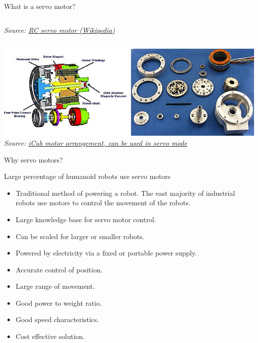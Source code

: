 \documentclass[compress]{beamer}
\newcommand{\source}[2]{{\tiny\it Source: \href{#1}{#2}}}
\begin{document}
\begin{frame}{What is a servo motor?}
\begin{columns}
\begin{column}{0.5\linewidth}
\begin{center}
    \source{http://en.wikipedia.org/wiki/Servomechanism}{RC servo motor (Wikipedia)}
            \end{center}
        \end{column}
    \end{columns}

    \begin{center}
        \includegraphics[width=0.8\linewidth]{image18}
    \source{http://www.iit.it/en/advanced-robotics/projects/the-lower-body-of-the-child-humanoid-robot-icub.html}{iCub motor arrangement, can be used in servo mode}

    \end{center}
\end{frame}

\begin{frame}{Why servo motors?}

    Large percentage of humanoid robots use servo motors

    \begin{itemize}

        \item Traditional method of powering a robot. The vast majority of
            industrial robots use motors to control the movement of the robots.
        \item Large knowledge base for servo motor control.
        \item Can be scaled for larger or smaller robots.
        \item Powered by electricity via a fixed or portable power supply.
        \item Accurate control of position.
        \item Large range of movement.
        \item Good power to weight ratio.
        \item Good speed characteristics.
        \item Cost effective solution.
    \end{itemize}

\end{frame}
\end{document}

